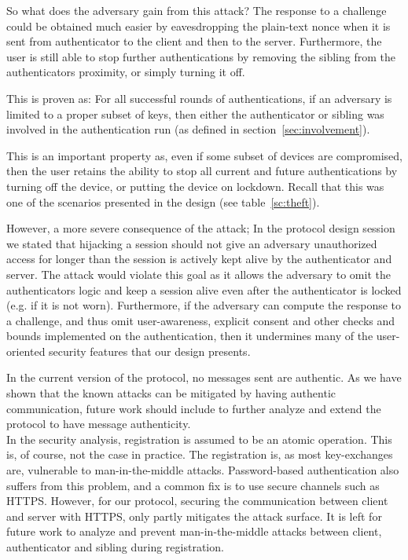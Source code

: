 So what does the adversary gain from this attack? The response to a challenge could be obtained much easier by eavesdropping the plain-text nonce when it is sent from \gls{authenticator} to the \gls{client} and then to the \gls{server}. Furthermore, the user is still able to stop further authentications by removing the \gls{sibling} from the \glspl{authenticator} proximity, or simply turning it off.

This is proven as: For all successful rounds of authentications, if an adversary is limited to a proper subset of keys, then either the \gls{authenticator} or \gls{sibling} was involved in the authentication run (as defined in section~\ref{sec:involvement}).

This is an important property as, even if some subset of devices are compromised, then the user retains the ability to stop all current and future authentications by turning off the device, or putting the device on lockdown. Recall that this was one of the scenarios presented in the design (see table~\ref{sc:theft}).

However, a more severe consequence of the attack; In the protocol design session we stated that hijacking a session should not give an adversary unauthorized access for longer than the session is actively kept alive by the \gls{authenticator} and \gls{server}. The attack would violate this goal as it allows the adversary to omit the \glspl{authenticator} logic and keep a session alive even after the \gls{authenticator} is locked (e.g. if it is not worn). Furthermore, if the adversary can compute the response to a challenge, and thus omit user-awareness, explicit consent and other checks and bounds implemented on the authentication, then it undermines many of the user-oriented security features that our design presents.

In the current version of the protocol, no messages sent are authentic. As we have shown that the known attacks can be mitigated by having authentic communication, future work should include to further analyze and extend the protocol to have message authenticity.\\

In the security analysis, registration is assumed to be an atomic operation. This is, of course, not the case in practice. The registration is, as most key-exchanges are, vulnerable to man-in-the-middle attacks. Password-based authentication also suffers from this problem, and a common fix is to use secure channels such as HTTPS.
However, for our protocol, securing the communication between \gls{client} and \gls{server} with HTTPS, only partly mitigates the attack surface. It is left for future work to analyze and prevent man-in-the-middle attacks between \gls{client}, \gls{authenticator} and \gls{sibling} during registration.


